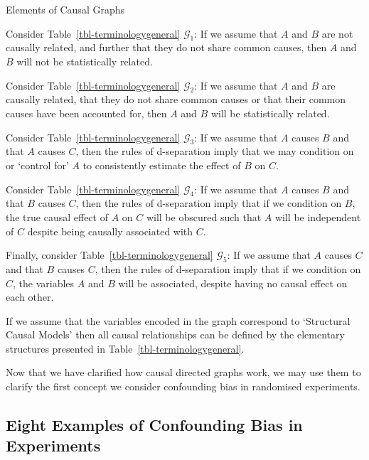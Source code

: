 \documentclass[
  single column]{article}
\begin{document}
\begin{table}

\caption{\label{tbl-terminologygeneral}Elements of Causal Graphs}

\centering{

\terminologydirectedgraph

}

\end{table}%

Consider Table~\ref{tbl-terminologygeneral} \(\mathcal{G}_1\): If we
assume that \(A\) and \(B\) are not causally related, and further that
they do not share common causes, then \(A\) and \(B\) will not be
statistically related.

Consider Table~\ref{tbl-terminologygeneral} \(\mathcal{G}_2\): If we
assume that \(A\) and \(B\) are causally related, that they do not share
common causes or that their common causes have been accounted for, then
\(A\) and \(B\) will be statistically related.

Consider Table~\ref{tbl-terminologygeneral} \(\mathcal{G}_3\): If we
assume that \(A\) causes \(B\) and that \(A\) causes \(C\), then the
rules of d-separation imply that we may condition on or `control for'
\(A\) to consistently estimate the effect of \(B\) on \(C\).

Consider Table~\ref{tbl-terminologygeneral} \(\mathcal{G}_4\): If we
assume that \(A\) causes \(B\) and that \(B\) causes \(C\), then the
rules of d-separation imply that if we condition on \(B\), the true
causal effect of \(A\) on \(C\) will be obscured such that \(A\) will be
independent of \(C\) despite being causally associated with \(C\).

Finally, consider Table~\ref{tbl-terminologygeneral} \(\mathcal{G}_5\):
If we assume that \(A\) causes \(C\) and that \(B\) causes \(C\), then
the rules of d-separation imply that if we condition on \(C\), the
variables \(A\) and \(B\) will be associated, despite having no causal
effect on each other.

If we assume that the variables encoded in the graph correspond to
`Structural Causal Models' then all causal relationships can be defined
by the elementary structures presented in
Table~\ref{tbl-terminologygeneral}.

Now that we have clarified how causal directed graphs work, we may use
them to clarify the first concept we consider confounding bias in
randomised experiments.

\subsection{Eight Examples of Confounding Bias in
Experiments}\label{eight-examples-of-confounding-bias-in-experiments}
\end{document}
